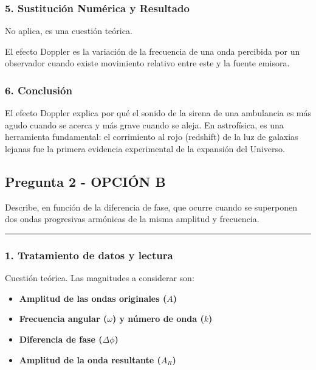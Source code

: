 \subsubsection*{5. Sustitución Numérica y Resultado}
No aplica, es una cuestión teórica.
\begin{cajaresultado}
El efecto Doppler es la variación de la frecuencia de una onda percibida por un observador cuando existe movimiento relativo entre este y la fuente emisora.
\end{cajaresultado}

\subsubsection*{6. Conclusión}
\begin{cajaconclusion}
El efecto Doppler explica por qué el sonido de la sirena de una ambulancia es más agudo cuando se acerca y más grave cuando se aleja. En astrofísica, es una herramienta fundamental: el corrimiento al rojo (redshift) de la luz de galaxias lejanas fue la primera evidencia experimental de la expansión del Universo.
\end{cajaconclusion}

\newpage

\subsection{Pregunta 2 - OPCIÓN B}
\label{subsec:2B_2002_jun_ord}

\begin{cajaenunciado}
Describe, en función de la diferencia de fase, que ocurre cuando se superponen dos ondas progresivas armónicas de la misma amplitud y frecuencia.
\end{cajaenunciado}
\hrule

\subsubsection*{1. Tratamiento de datos y lectura}
Cuestión teórica. Las magnitudes a considerar son:
\begin{itemize}
    \item \textbf{Amplitud de las ondas originales ($A$)}
    \item \textbf{Frecuencia angular ($\omega$) y número de onda ($k$)}
    \item \textbf{Diferencia de fase ($\Delta\phi$)}
    \item \textbf{Amplitud de la onda resultante ($A_R$)}
\end{itemize}

